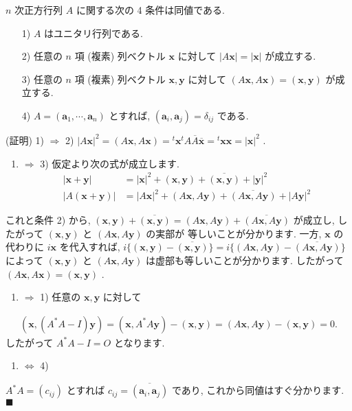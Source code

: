 \documentclass[openany, a4paper, oneside]{jsbook}
\begin{document}
\begin{thm}
 $n$ 次正方行列 $A$ に関する次の 4 条件は同値である.
\begin{enumerate}
    \item[1)] $A$ はユニタリ行列である.
    \item[2)] 任意の $n$ 項 (複素) 列ベクトル $\bm{x}$ に対して $| A\bm{x} | = | \bm{x} |$ が成立する.
    \item[3)] 任意の $n$ 項 (複素) 列ベクトル $\bm{x},\bm{y}$ に対して $(A\bm{x},A\bm{x})=(\bm{x},\bm{y})$ が成立する.
    \item[4)] $A=(\bm{a}_1,\dotsb,\bm{a}_n)$ とすれば,  $(\bm{a}_i,\bm{a}_j)=\delta_{ij}$ である.
\end{enumerate}
\end{thm}
(証明) 1) $\Rightarrow$ 2)
 $|A\bm{x}|^2 = ( A \bm{x} , A \bm{x} ) = {^t} \bm{x} {^t} A \overline{A} \overline{\bm{x}} = {^t} \bm{x} \bm{x} = |\bm{x}|^2$ .

\begin{enumerate}
\item $\Rightarrow$ 3) 仮定より次の式が成立します.
\begin{align}
    |\bm{x}+\bm{y}|
    &=
    |\bm{x}|^2 + (\bm{x},\bm{y}) + \overline{(\bm{x},\bm{y})} + |\bm{y}|^2\\
    |A (\bm{x}+\bm{y})|
    &=
    |A\bm{x}|^2 + (A\bm{x},A\bm{y}) + \overline{(A\bm{x},A\bm{y})} + |A\bm{y}|^2
\end{align}
\end{enumerate}
これと条件 2) から, $(\bm{x},\bm{y}) + \overline{(\bm{x},\bm{y})}=(A\bm{x},A\bm{y}) + \overline{(A\bm{x},A\bm{y})}$
が成立し, したがって $(\bm{x},\bm{y})$ と $(A\bm{x},A\bm{y})$ の実部が
等しいことが分かります.
一方,  $\bm{x}$ の代わりに $i\bm{x}$ を代入すれば,
$i\{(\bm{x},\bm{y})-\overline{(\bm{x},\bm{y})}\}=i\{(A\bm{x},A\bm{y}) - \overline{(A\bm{x},A\bm{y})}\}$
によって $(\bm{x},\bm{y})$ と $(A\bm{x},A\bm{y})$ は虚部も等しいことが分かります.
したがって $(A\bm{x},A\bm{x})=(\bm{x},\bm{y})$ .

\begin{enumerate}
\item $\Rightarrow$ 1) 任意の $\bm{x},\bm{y}$ に対して
\end{enumerate}
\begin{align}
 (\bm{x},(A^*A-I)\bm{y})
 =
 (\bm{x},A^*A\bm{y})-(\bm{x},\bm{y})
 =
 (A\bm{x},A\bm{y})-(\bm{x},\bm{y})
 = 0.
\end{align}
したがって $A^*A-I=O$ となります.

\begin{enumerate}
\item $\Leftrightarrow$ 4)
\end{enumerate}
$A^*A=(c_{ij})$ とすれば $c_{ij}=\overline{(\bm{a}_i,\bm{a}_j)}$ であり,
これから同値はすぐ分かります.  $\blacksquare$
\end{document}
